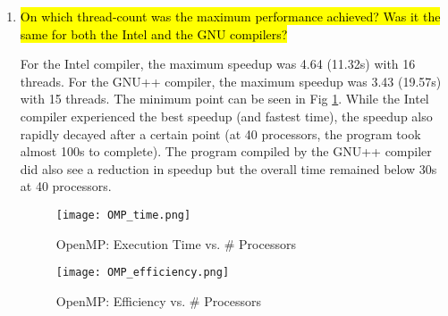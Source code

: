 \documentclass{article}
\begin{document}
\begin{enumerate}
	\item \hl{On which thread-count was the maximum performance achieved? Was it the same for both the Intel and the GNU compilers?}

	For the Intel compiler, the maximum speedup was 4.64 (11.32s) with 16 threads. For the GNU++ compiler, the maximum speedup was 3.43 (19.57s) with 15 threads. The minimum point can be seen in Fig \ref{fig:omp_time}. While the Intel compiler experienced the best speedup (and fastest time), the speedup also rapidly decayed after a certain point (at 40 processors, the program took almost 100s to complete). The program compiled by the GNU++ compiler did also see a reduction in speedup but the overall time remained below 30s at 40 processors.
	
		\begin{figure}[ht!] %
	 	\begin{center}
	 		\texttt{[image: OMP\_time.png]} %
	 		\caption{OpenMP: Execution Time vs. \# Processors}
	 		\label{fig:omp_time}
	 	\end{center}
	\end{figure}
	
			\begin{figure}[ht!] %
	 	\begin{center}
	 		\texttt{[image: OMP\_efficiency.png]} %
	 		\caption{OpenMP: Efficiency vs. \# Processors}
	 		\label{fig:omp_efficiency}
	 	\end{center}
	\end{figure}

\end{enumerate}
\end{document}
